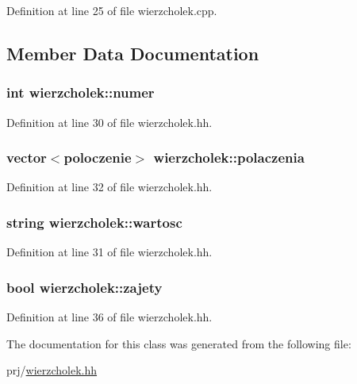 \-Definition at line 25 of file wierzcholek.\-cpp.



\subsection{\-Member \-Data \-Documentation}
\hypertarget{classwierzcholek_a66aaea6b1187250f7100542adc1617d2}{
\subsubsection[{numer}]{\setlength{\rightskip}{0pt plus 5cm}int {\bf wierzcholek\-::numer}}}\label{classwierzcholek_a66aaea6b1187250f7100542adc1617d2}


\-Definition at line 30 of file wierzcholek.\-hh.

\hypertarget{classwierzcholek_a34145a2de26c5e95c1ec72b0773005f4}{
\subsubsection[{polaczenia}]{\setlength{\rightskip}{0pt plus 5cm}vector$<${\bf poloczenie}$>$ {\bf wierzcholek\-::polaczenia}}}\label{classwierzcholek_a34145a2de26c5e95c1ec72b0773005f4}


\-Definition at line 32 of file wierzcholek.\-hh.

\hypertarget{classwierzcholek_a19aa16bf7e01a987fcc360e5da902209}{
\subsubsection[{wartosc}]{\setlength{\rightskip}{0pt plus 5cm}string {\bf wierzcholek\-::wartosc}}}\label{classwierzcholek_a19aa16bf7e01a987fcc360e5da902209}


\-Definition at line 31 of file wierzcholek.\-hh.

\hypertarget{classwierzcholek_ad67644b5f408397f28d7150d3bac76d2}{
\subsubsection[{zajety}]{\setlength{\rightskip}{0pt plus 5cm}bool {\bf wierzcholek\-::zajety}}}\label{classwierzcholek_ad67644b5f408397f28d7150d3bac76d2}


\-Definition at line 36 of file wierzcholek.\-hh.



\-The documentation for this class was generated from the following file\-:\begin{DoxyCompactItemize}
\item 
prj/\hyperlink{wierzcholek_8hh}{wierzcholek.\-hh}\end{DoxyCompactItemize}
